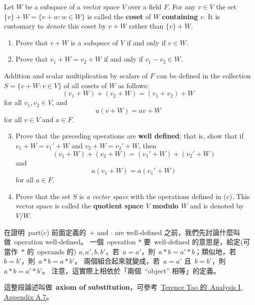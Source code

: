\begin{exercise} \label{exercise 1.3.31}
Let \(W\) be a subspace of a vector space \(V\) over a field \(F\).
For any \(v \in V\) the set \(\{v\} + W = \{v + w : w \in W\}\) is called the \textbf{coset} of \(W\) \textbf{containing} \(v\).
It is customary to \emph{denote} this coset by \(v + W\) rather than \(\{v\} + W\).
\begin{enumerate}
    \item Prove that \(v + W\) is a \(subspace\) of \(V\) if and only if \(v \in W\).
    \item Prove that \(v_1 + W = v_2 + W\) if and only if \(v_1 - v_2 \in W\).
\end{enumerate}
Addition and scalar multiplication by scalars of \(F\) can be defined in the collection \(S = \{v + W: v \in V\}\) of all cosets of \(W\) as follows:
\[
    (v_1 + W) + (v_2 + W) = (v_1 + v_2) + W
\]
for all \(v_1, v_2 \in V\), and
\[
    a(v + W) = av + W
\]
for all \(v \in V\) and \(a \in F\).
\begin{enumerate}
    \setcounter{enumi}{2}
    \item Prove that the preceding operations are \textbf{well defined};
        that is, show that if \(v_1 + W = v_1' + W\) and \(v_2 + W = v_2' + W\), then
        \[
            (v_1 + W) + (v_2 + W) = (v_1' + W) + (v_2' + W)
        \]
        and
        \[
            a(v_1 + W) = a(v_1' + W)
        \]
        for all \(a \in F\).
    \item Prove that the set \(S\) is \emph{a vector space} with the operations defined in (c).
    This vector space is called the \textbf{quotient space \(V\) modulo \(W\)} and is denoted by \(V / W\).
\end{enumerate}
\end{exercise}

\begin{note}
在證明\ part(c) 前面定義的\ \(+\) and \(\cdot\) are well-defined 之前，我們先討論什麼叫做\ operation well-defined。
一個\ operation \(*\) 要\ well-defined 的意思是，給定(可當作\ \(*\) 的\ operands 的) \(a, a', b, b'\)，若\ \(a = a'\)，則\ \(a * b = a' * b\)；類似地，若\ \(b = b'\)，則\ \(a * b = a * b'\)。
兩個組合起來就變成，若\ \(a = a'\) 且\ \(b = b'\)，則\ \(a * b = a' * b'\)。
注意，這實際上相依於「兩個\ ``object'' 相等」的定義。

這整段論述叫做\ \textbf{axiom of substitution}，可參考\ \href{https://link.springer.com/book/10.1007/978-981-10-1789-6}{Terence Tao 的\ Analysis I, Appendix A.7}。
\end{note}

